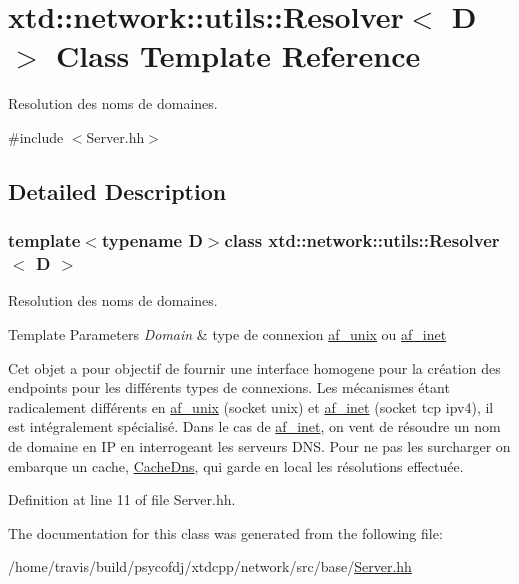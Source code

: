 \hypertarget{classxtd_1_1network_1_1utils_1_1Resolver}{\section{xtd\-:\-:network\-:\-:utils\-:\-:Resolver$<$ D $>$ Class Template Reference}
\label{classxtd_1_1network_1_1utils_1_1Resolver}
}


Resolution des noms de domaines.  




{\ttfamily \#include $<$Server.\-hh$>$}



\subsection{Detailed Description}
\subsubsection*{template$<$typename D$>$class xtd\-::network\-::utils\-::\-Resolver$<$ D $>$}

Resolution des noms de domaines. 


\begin{DoxyTemplParams}{Template Parameters}
{\em Domain} & type de connexion \hyperlink{namespacextd_1_1network_1_1utils_a60e83921a2d026f07b49fa094988acdf}{af\-\_\-unix} ou \hyperlink{namespacextd_1_1network_1_1utils_a6238bab7a616eda8c9424721444a18d1}{af\-\_\-inet}\\
\hline
\end{DoxyTemplParams}
Cet objet a pour objectif de fournir une interface homogene pour la création des endpoints pour les différents types de connexions. Les mécanismes étant radicalement différents en \hyperlink{namespacextd_1_1network_1_1utils_a60e83921a2d026f07b49fa094988acdf}{af\-\_\-unix} (socket unix) et \hyperlink{namespacextd_1_1network_1_1utils_a6238bab7a616eda8c9424721444a18d1}{af\-\_\-inet} (socket tcp ipv4), il est intégralement spécialisé. Dans le cas de \hyperlink{namespacextd_1_1network_1_1utils_a6238bab7a616eda8c9424721444a18d1}{af\-\_\-inet}, on vent de résoudre un nom de domaine en I\-P en interrogeant les serveurs D\-N\-S. Pour ne pas les surcharger on embarque un cache, \hyperlink{classxtd_1_1network_1_1utils_1_1CacheDns}{Cache\-Dns}, qui garde en local les résolutions effectuée. 

Definition at line 11 of file Server.\-hh.



The documentation for this class was generated from the following file\-:\begin{DoxyCompactItemize}
\item 
/home/travis/build/psycofdj/xtdcpp/network/src/base/\hyperlink{base_2Server_8hh}{Server.\-hh}\end{DoxyCompactItemize}

